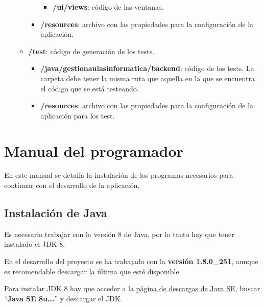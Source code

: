 \begin{itemize}
\begin{itemize}
\begin{itemize}
\begin{itemize}
                            \item \textbf{/ui/views}: código de las ventanas.
                        	
                        \end{itemize}
                	
                	\item \textbf{/resources}: archivo con las propiedades para la configuración de la aplicación.
                \end{itemize}
                
        	\item \textbf{/test}: código de generación de los tests.
        	    \begin{itemize}
            	\tightlist
                	\item \textbf{/java/gestionaulasinformatica/backend}: código de los tests. La carpeta debe tener la misma ruta que aquella en la que se encuentra el código que se está testeando.
                	
                	\item \textbf{/resources}: archivo con las propiedades para la configuración de la aplicación para los test.
                \end{itemize}
        \end{itemize}
	
\end{itemize}

\section{Manual del programador}
En este manual se detalla la instalación de los programas necesarios para continuar con el desarrollo de la aplicación.

\subsection{Instalación de Java}
Es necesario trabajar con la versión 8 de Java, por lo tanto hay que tener instalado el JDK 8.

En el desarrollo del proyecto se ha trabajado con la \textbf{versión 1.8.0\_251}, aunque es recomendable descargar la última que esté disponible.

Para instalar JDK 8 hay que acceder a la \href{https://www.oracle.com/java/technologies/javase-downloads.html}{página de descargas de Java SE}, buscar ``\textbf{Java SE 8u...}'' y descargar el JDK.

